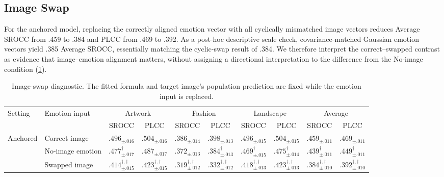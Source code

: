 \documentclass[10pt,twocolumn,letterpaper]{article}
\begin{document}
\subsection{Image Swap}

For the anchored model, replacing the correctly aligned emotion vector with
all cyclically mismatched image vectors reduces Average SROCC from .459 to
.384 and PLCC from .469 to .392. As a post-hoc descriptive scale check,
covariance-matched Gaussian emotion vectors yield .385 Average SROCC,
essentially matching the cyclic-swap result of .384. We therefore
interpret the correct--swapped contrast as evidence that image--emotion
alignment matters, without assigning a directional interpretation to the
difference from the No-image condition (\cref{tab:image_swap}).

\begin{table}[!tbp]
\centering
\begin{threeparttable}
\caption{Image-swap diagnostic. The fitted formula and target image's
population prediction are fixed while the emotion input is replaced.}
\label{tab:image_swap}
\footnotesize
\setlength{\tabcolsep}{1.6pt}
    \begin{tabular}{ll cc cc cc cc}
    \toprule
    \multirow{2}{*}{Setting} & \multirow{2}{*}{Emotion input} & \multicolumn{2}{c}{Artwork} & \multicolumn{2}{c}{Fashion} & \multicolumn{2}{c}{Landscape} & \multicolumn{2}{c}{Average} \\
    \cmidrule(lr){3-4}\cmidrule(lr){5-6}\cmidrule(lr){7-8}\cmidrule(lr){9-10}
    & & SROCC & PLCC & SROCC & PLCC & SROCC & PLCC & SROCC & PLCC \\
    \midrule
    \multirow{3}{*}{Anchored} & Correct image & $\bm{.496_{\pm .016}}$ & $\bm{.504_{\pm .016}}$ & $\bm{.386_{\pm .014}}$ & $\bm{.398_{\pm .013}}$ & $\bm{.496_{\pm .015}}$ & $\bm{.504_{\pm .015}}$ & $\bm{.459_{\pm .011}}$ & $\bm{.469_{\pm .011}}$ \\
    & No-image emotion & $.477_{\pm .017}^{\dagger}$ & $.487_{\pm .017}$ & $.372_{\pm .013}$ & $.384_{\pm .013}^{\dagger}$ & $.469_{\pm .015}^{\dagger}$ & $.475_{\pm .014}^{\dagger}$ & $.439_{\pm .011}^{\dagger}$ & $.449_{\pm .011}^{\dagger}$ \\
    & Swapped image & $.414_{\pm .015}^{\dagger,\ddagger}$ & $.423_{\pm .015}^{\dagger,\ddagger}$ & $.319_{\pm .012}^{\dagger,\ddagger}$ & $.332_{\pm .012}^{\dagger,\ddagger}$ & $.418_{\pm .013}^{\dagger,\ddagger}$ & $.423_{\pm .013}^{\dagger,\ddagger}$ & $.384_{\pm .010}^{\dagger,\ddagger}$ & $.392_{\pm .010}^{\dagger,\ddagger}$ \\

\end{tabular}
\end{threeparttable}
\end{table}
\end{document}
